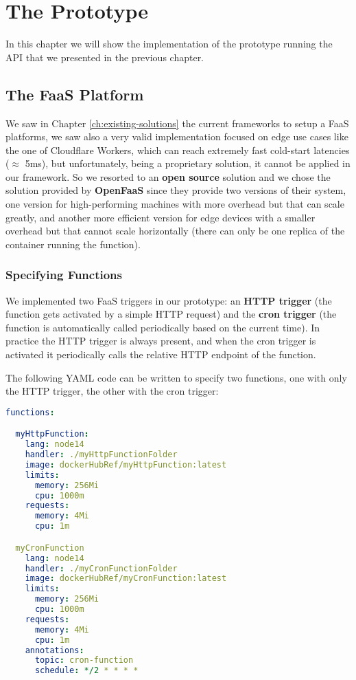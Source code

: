 \chapter{The Prototype}
\label{ch:prototype}

In this chapter we will show the implementation of the prototype running the API that we presented in the previous chapter.

\section{The FaaS Platform}
We saw in Chapter \ref{ch:existing-solutions} the current frameworks to setup a FaaS platforms, we saw also a very valid implementation focused on edge use cases like the one of Cloudflare Workers, which can reach extremely fast cold-start latencies ($\approx$ 5ms), but unfortunately, being a proprietary solution, it cannot be applied in our framework.
So we resorted to an \textbf{open source} solution and we chose the solution provided by \textbf{OpenFaaS} since they provide two versions of their system, one version for high-performing machines with more overhead but that can scale greatly, and another more efficient version for edge devices with a smaller overhead but that cannot scale horizontally (there can only be one replica of the container running the function).


\subsection{Specifying Functions}
\label{subsec:specifying-functions}

We implemented two FaaS triggers in our prototype: an \textbf{HTTP trigger} (the function gets activated by a simple HTTP request) and the \textbf{cron trigger} (the function is automatically called periodically based on the current time). In practice the HTTP trigger is always present, and when the cron trigger is activated it periodically calls the relative HTTP endpoint of the function.

The following YAML code can be written to specify two functions, one with only the HTTP trigger, the other with the cron trigger:

\begin{lstlisting}[language=yaml,firstnumber=1]
functions:

  myHttpFunction:
    lang: node14
    handler: ./myHttpFunctionFolder
    image: dockerHubRef/myHttpFunction:latest
    limits:
      memory: 256Mi
      cpu: 1000m
    requests:
      memory: 4Mi
      cpu: 1m

  myCronFunction
    lang: node14
    handler: ./myCronFunctionFolder
    image: dockerHubRef/myCronFunction:latest
    limits:
      memory: 256Mi
      cpu: 1000m
    requests:
      memory: 4Mi
      cpu: 1m
    annotations:
      topic: cron-function
      schedule: */2 * * * *
\end{lstlisting}

